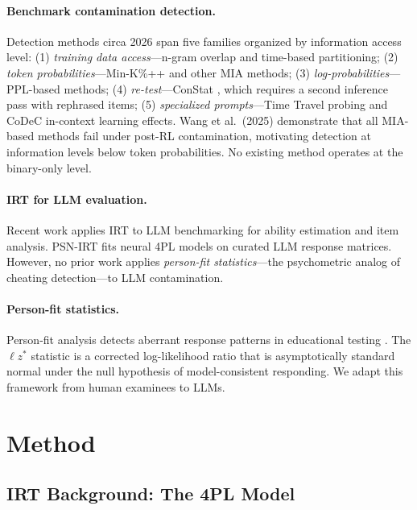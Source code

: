 \documentclass[11pt,a4paper]{article}
\begin{document}
\paragraph{Benchmark contamination detection.}
Detection methods circa 2026 span five families organized by information access level:
(1) \emph{training data access}---n-gram overlap and time-based partitioning;
(2) \emph{token probabilities}---Min-K\%++ \citep{shi2024detecting} and other MIA methods;
(3) \emph{log-probabilities}---PPL-based methods;
(4) \emph{re-test}---ConStat \citep{dekoninck2024constat}, which requires a second inference pass with rephrased items;
(5) \emph{specialized prompts}---Time Travel probing \citep{oren2024proving} and CoDeC in-context learning effects.
Wang et al.\ (2025) demonstrate that all MIA-based methods fail under post-RL contamination, motivating detection at information levels below token probabilities.
No existing method operates at the binary-only level.

\paragraph{IRT for LLM evaluation.}
Recent work applies IRT to LLM benchmarking for ability estimation and item analysis.
PSN-IRT fits neural 4PL models on curated LLM response matrices.
However, no prior work applies \emph{person-fit statistics}---the psychometric analog of cheating detection---to LLM contamination.

\paragraph{Person-fit statistics.}
Person-fit analysis detects aberrant response patterns in educational testing \citep{meijer2001person}.
The $\ell z^*$ statistic \citep{snijders2001} is a corrected log-likelihood ratio that is asymptotically standard normal under the null hypothesis of model-consistent responding.
We adapt this framework from human examinees to LLMs.


\section{Method}

\subsection{IRT Background: The 4PL Model}
\end{document}
